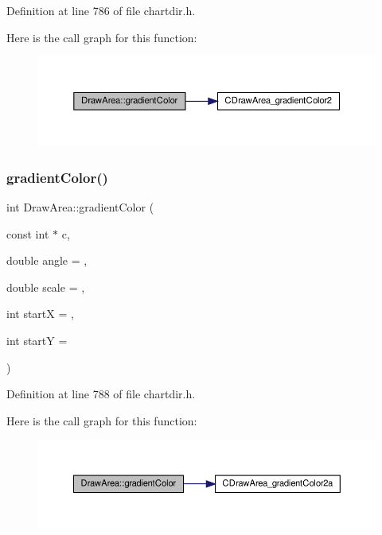 Definition at line 786 of file chartdir.\+h.

Here is the call graph for this function\+:
\nopagebreak
\begin{figure}[H]
\begin{center}
\leavevmode
\includegraphics[width=350pt]{class_draw_area_aaca6cafb67a66b3d6f2bd45336539c75_cgraph}
\end{center}
\end{figure}
\mbox{\label{class_draw_area_abcb0e51d8a4f132a433e374ccc9905d6}} 
\subsubsection{\texorpdfstring{gradient\+Color()}{gradientColor()}\hspace{0.1cm}{\footnotesize\ttfamily [3/3]}}
{\footnotesize\ttfamily int Draw\+Area\+::gradient\+Color (\begin{DoxyParamCaption}\item[{const int $\ast$}]{c,  }\item[{double}]{angle = {},  }\item[{double}]{scale = {},  }\item[{int}]{startX = {},  }\item[{int}]{startY = {} }\end{DoxyParamCaption})\hspace{0.3cm}{\ttfamily [inline]}}



Definition at line 788 of file chartdir.\+h.

Here is the call graph for this function\+:
\nopagebreak
\begin{figure}[H]
\begin{center}
\leavevmode
\includegraphics[width=350pt]{class_draw_area_abcb0e51d8a4f132a433e374ccc9905d6_cgraph}
\end{center}
\end{figure}
\mbox{\label{class_draw_area_a8fbf62770f095f2cebf2f006a47b691f}} 
